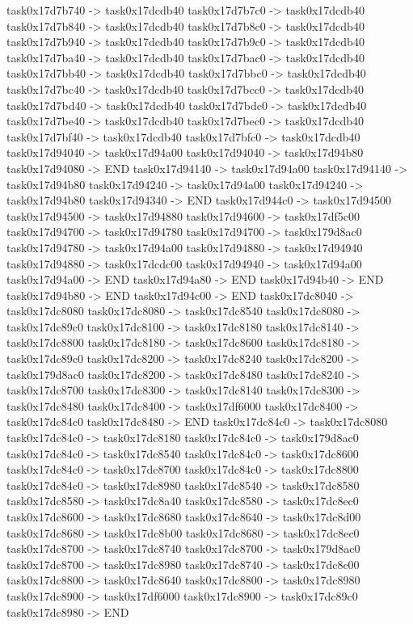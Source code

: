 {	task0x17d7b740 -> task0x17dcdb40
	task0x17d7b7c0 -> task0x17dcdb40
	task0x17d7b840 -> task0x17dcdb40
	task0x17d7b8c0 -> task0x17dcdb40
	task0x17d7b940 -> task0x17dcdb40
	task0x17d7b9c0 -> task0x17dcdb40
	task0x17d7ba40 -> task0x17dcdb40
	task0x17d7bac0 -> task0x17dcdb40
	task0x17d7bb40 -> task0x17dcdb40
	task0x17d7bbc0 -> task0x17dcdb40
	task0x17d7bc40 -> task0x17dcdb40
	task0x17d7bcc0 -> task0x17dcdb40
	task0x17d7bd40 -> task0x17dcdb40
	task0x17d7bdc0 -> task0x17dcdb40
	task0x17d7be40 -> task0x17dcdb40
	task0x17d7bec0 -> task0x17dcdb40
	task0x17d7bf40 -> task0x17dcdb40
	task0x17d7bfc0 -> task0x17dcdb40
	task0x17d94040 -> task0x17d94a00
	task0x17d94040 -> task0x17d94b80
	task0x17d94080 -> END
	task0x17d94140 -> task0x17d94a00
	task0x17d94140 -> task0x17d94b80
	task0x17d94240 -> task0x17d94a00
	task0x17d94240 -> task0x17d94b80
	task0x17d94340 -> END
	task0x17d944c0 -> task0x17d94500
	task0x17d94500 -> task0x17d94880
	task0x17d94600 -> task0x17df5c00
	task0x17d94700 -> task0x17d94780
	task0x17d94700 -> task0x179d8ac0
	task0x17d94780 -> task0x17d94a00
	task0x17d94880 -> task0x17d94940
	task0x17d94880 -> task0x17dcdc00
	task0x17d94940 -> task0x17d94a00
	task0x17d94a00 -> END
	task0x17d94a80 -> END
	task0x17d94b40 -> END
	task0x17d94b80 -> END
	task0x17d94c00 -> END
	task0x17dc8040 -> task0x17dc8080
	task0x17dc8080 -> task0x17dc8540
	task0x17dc8080 -> task0x17dc89c0
	task0x17dc8100 -> task0x17dc8180
	task0x17dc8140 -> task0x17dc8800
	task0x17dc8180 -> task0x17dc8600
	task0x17dc8180 -> task0x17dc89c0
	task0x17dc8200 -> task0x17dc8240
	task0x17dc8200 -> task0x179d8ac0
	task0x17dc8200 -> task0x17dc8480
	task0x17dc8240 -> task0x17dc8700
	task0x17dc8300 -> task0x17dc8140
	task0x17dc8300 -> task0x17dc8480
	task0x17dc8400 -> task0x17df6000
	task0x17dc8400 -> task0x17dc84c0
	task0x17dc8480 -> END
	task0x17dc84c0 -> task0x17dc8080
	task0x17dc84c0 -> task0x17dc8180
	task0x17dc84c0 -> task0x179d8ac0
	task0x17dc84c0 -> task0x17dc8540
	task0x17dc84c0 -> task0x17dc8600
	task0x17dc84c0 -> task0x17dc8700
	task0x17dc84c0 -> task0x17dc8800
	task0x17dc84c0 -> task0x17dc8980
	task0x17dc8540 -> task0x17dc8580
	task0x17dc8580 -> task0x17dc8a40
	task0x17dc8580 -> task0x17dc8ec0
	task0x17dc8600 -> task0x17dc8680
	task0x17dc8640 -> task0x17dc8d00
	task0x17dc8680 -> task0x17dc8b00
	task0x17dc8680 -> task0x17dc8ec0
	task0x17dc8700 -> task0x17dc8740
	task0x17dc8700 -> task0x179d8ac0
	task0x17dc8700 -> task0x17dc8980
	task0x17dc8740 -> task0x17dc8c00
	task0x17dc8800 -> task0x17dc8640
	task0x17dc8800 -> task0x17dc8980
	task0x17dc8900 -> task0x17df6000
	task0x17dc8900 -> task0x17dc89c0
	task0x17dc8980 -> END
}
